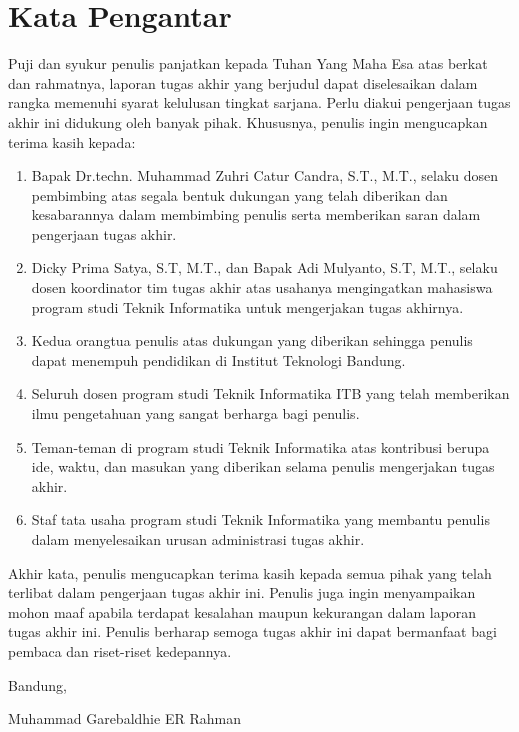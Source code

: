 \chapter*{Kata Pengantar}

Puji dan syukur penulis panjatkan kepada Tuhan Yang Maha Esa atas berkat dan rahmatnya, laporan tugas akhir yang berjudul \thetitle{} dapat diselesaikan dalam rangka memenuhi syarat kelulusan tingkat sarjana. Perlu diakui pengerjaan tugas akhir ini didukung oleh banyak pihak. Khususnya, penulis ingin mengucapkan terima kasih kepada:

\begin{enumerate}
    \item Bapak Dr.techn. Muhammad Zuhri Catur Candra, S.T., M.T., selaku dosen pembimbing atas segala bentuk dukungan yang telah diberikan dan kesabarannya dalam membimbing penulis serta memberikan saran dalam pengerjaan tugas akhir.
    \item Dicky Prima Satya, S.T, M.T., dan Bapak Adi Mulyanto, S.T, M.T., selaku dosen koordinator tim tugas akhir atas usahanya mengingatkan mahasiswa program studi Teknik Informatika untuk mengerjakan tugas akhirnya.
    \item Kedua orangtua penulis atas dukungan yang diberikan sehingga penulis dapat menempuh pendidikan di Institut Teknologi Bandung.
    \item Seluruh dosen program studi Teknik Informatika ITB yang telah memberikan ilmu pengetahuan yang sangat berharga bagi penulis.
    \item Teman-teman di program studi Teknik Informatika atas kontribusi berupa ide, waktu, dan masukan yang diberikan selama penulis mengerjakan tugas akhir.
    \item Staf tata usaha program studi Teknik Informatika yang membantu penulis dalam menyelesaikan urusan administrasi tugas akhir.
\end{enumerate}

Akhir kata, penulis mengucapkan terima kasih kepada semua pihak yang telah terlibat dalam pengerjaan tugas akhir ini. Penulis juga ingin menyampaikan mohon maaf apabila terdapat kesalahan maupun kekurangan dalam laporan tugas akhir ini. Penulis berharap semoga tugas akhir ini dapat bermanfaat bagi pembaca dan riset-riset kedepannya.

\begin{flushright}
    \vspace{0.5cm}
    Bandung, \tanggalpengesahan


    \vspace{1.5cm}

    Muhammad Garebaldhie ER Rahman
\end{flushright}